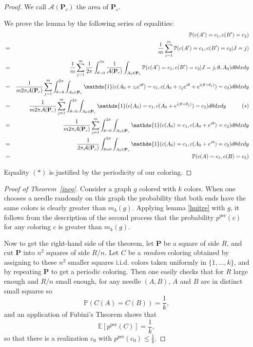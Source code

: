 \documentclass[a4paper,11pt]{article}
\theoremstyle{definition}
\theoremstyle{remark}
\renewcommand{\Pr}{\mathbb{P}}
\newcommand{\Esp}{\mathbb{E}}
\renewcommand{\P}{\mathbf{P}}
\newcommand{\pper}{p^{\mathrm{per}}}
\begin{document}
\begin{proof}
We call $\mathcal{A}(\P_c)$ the area of $\P_c$.

We prove the lemma by the following series of equalities:
\begin{eqnarray*}
& & \mathbb{P}(c(A') = c_1, c(B') = c_2) \\
  &=& \frac{1}{m}\sum_{j=1}^{m} \mathbb{P}(c(A') = c_1, c(B') = c_2 | J=j)  \\
  &=& \frac{1}{m}\sum_{j=1}^{m}  \frac{1}{2\pi}\int_{\theta =0} ^{2\pi} \frac{1}{\mathcal{A}(\P_c)}\int_{A_0 \in \P_c} \mathbb{P}(c(A') = c_1, c(B') = c_2 | J=j, \theta, A_0) d\theta dx dy \\  
  &=& \frac{1}{m 2\pi \mathcal{A}(\P_c)}\sum_{j=1}^{m}\int_{\theta =0} ^{2\pi} \int_{A_0 \in \P_c} \mathds{1}(c(A_0 + z_i e^{i\theta}) = c_1, c(A_0 +z_j e^{i\theta} + e^{i (\theta + \theta_j)}) = c_2) d\theta dx dy \\  
    &=& \frac{1}{m 2\pi \mathcal{A}(\P_c)}\sum_{j=1}^{m} \int_{\theta =0} ^{2\pi} \int_{A_0 \in \P_c} \mathds{1}(c(A_0) = c_1, c(A_0 + e^{i (\theta + \theta_j)}) = c_2 ) d\theta dx dy \hspace{1 cm} (*)\\ 
    &=& \frac{1}{m 2\pi \mathcal{A}(\P_c)}\sum_{j=1}^{m} \int_{\theta =0} ^{2\pi} \int_{A_0 \in \P_c} \mathds{1}(c(A_0) = c_1, c(A_0 + e^{i \theta}) = c_2 ) d\theta dx dy \\ 
    &=& \frac{1}{2\pi \mathcal{A}(\P_c)}\int_{\theta =0} ^{2\pi} \int_{A_0 \in \P_c} \mathds{1}(c(A_0) = c_1, c(A_0 + e^{i \theta}) = c_2 ) d\theta dx dy \\ 
    &=& \mathbb{P}(c(A) = c_1, c(B) = c_2)
\end{eqnarray*}

Equality $(*)$ is justified by the periodicity of our coloring.
\end{proof}

\begin{proof}[Proof of Theorem~\ref{ineg}]
Consider a graph $g$ colored with $k$ colors. When one chooses a needle
randomly on this graph the probability that both ends have the same
colors is clearly greater than $m_k(g)$. Applying lemma \ref{huitre} with $g$, 
it follows from the description of the second process that the probability 
$\pper(c)$ for any coloring $c$ is greater than $m_k(g)$.

Now to get the right-hand side of the theorem, let $\P$ be a square of side $R$,
and cut $\P$ into $n^2$ squares of side $R/n$. Let $C$ be a \textit{random} 
coloring obtained by assigning to these $n^2$ smaller squares i.i.d. colors
taken uniformly in $\{1,\dots,k\}$, and by repeating $\P$ to get a periodic 
coloring. Then one easily checks that for $R$ large enough and $R/n$ small
enough, for any needle $(A,B)$, $A$ and $B$ are in distinct small squares so
$$\Pr(C(A)=C(B)) = \frac1k,$$
and an application of Fubini's Theorem shows that
$$\Esp[\pper(C)] = \frac1k,$$
so that there is a realization $c_0$ with $\pper(c_0) \leq \frac1k$.
\end{proof}
\end{document}
